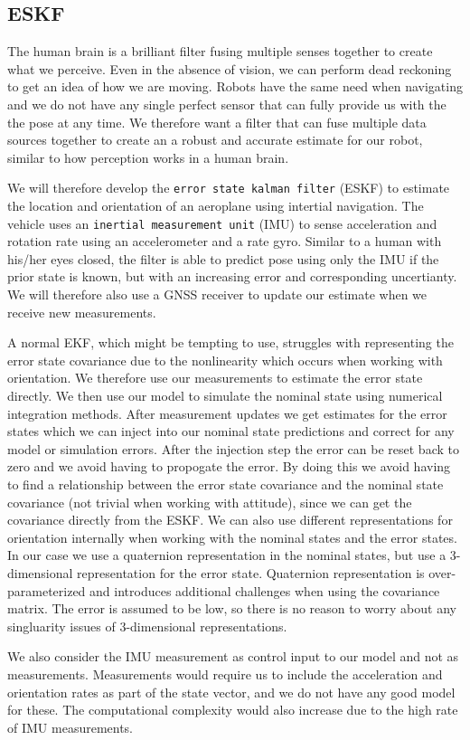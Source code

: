 \subsection{ESKF}
The human brain is a brilliant filter fusing multiple senses together to create what we perceive. Even in the absence of vision, we can perform dead reckoning to get an idea of how we are moving.
Robots have the same need when navigating and we do not have any single perfect sensor that can fully provide us with the the pose at any time. We therefore want a filter that can fuse multiple data sources together to create an a robust and accurate estimate for our robot, similar to how perception works in a human brain.

We will therefore develop the \texttt{error state kalman filter} (ESKF) to estimate the location and orientation of an aeroplane using intertial navigation. The vehicle uses an \texttt{inertial measurement unit} (IMU) to sense acceleration and rotation rate using an accelerometer and a rate gyro. Similar to a human with his/her eyes closed, the filter is able to predict pose using only the IMU if the prior state is known, but with an increasing error and corresponding uncertianty. We will therefore also use a GNSS receiver to update our estimate when we receive new measurements.

A normal EKF, which might be tempting to use, struggles with representing the error state covariance due to the nonlinearity which occurs when working with orientation. We therefore use our measurements to estimate the error state directly. We then use our model to simulate the nominal state using numerical integration methods. After measurement updates we get estimates for the error states which we can inject into our nominal state predictions and correct for any model or simulation errors. After the injection step the error can be reset back to zero and we avoid having to propogate the error.
By doing this we avoid having to find a relationship between the error state covariance and the nominal state covariance (not trivial when working with attitude), since we can get the covariance directly from the ESKF. We can also use different representations for orientation internally when working with the nominal states and the error states. In our case we use a quaternion representation in the nominal states, but use a 3-dimensional representation for the error state. Quaternion representation is over-parameterized and introduces additional challenges when using the covariance matrix. The error is assumed to be low, so there is no reason to worry about any singluarity issues of 3-dimensional representations.

We also consider the IMU measurement as control input to our model and not as measurements. Measurements would require us to include the acceleration and orientation rates as part of the state vector, and we do not have any good model for these. The computational complexity would also increase due to the high rate of IMU measurements.

